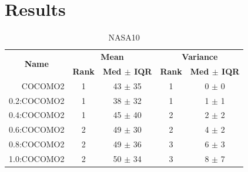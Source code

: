 \documentclass[final,twocolumn,5p]{elsarticle}
\theoremstyle{break}
\begin{document}
 \section{Results}
 
 
 
\begin{table}[!htpb]
\centering
\caption{NASA10}
\scriptsize
\label{tab:nasa10}
\begin{tabular}{|r|c|c|c|c|}
\hline
\multicolumn{1}{|c|}{\multirow{2}{*}{\textbf{Name}}} & \multicolumn{2}{c|}{\textbf{Mean}}     & \multicolumn{2}{c|}{\textbf{Variance}} \\ \cline{2-5} 
\multicolumn{1}{|c|}{}                               & \textbf{Rank} & \textbf{Med $\pm$ IQR} & \textbf{Rank} & \textbf{Med $\pm$ IQR} \\ \hline
COCOMO2                                              & 1             & 43 $\pm$ 35            & 1             & 0 $\pm$ 0              \\
0.2:COCOMO2                                          & 1             & 38 $\pm$ 32            & 1             & 1 $\pm$ 1              \\ \cline{4-5}
0.4:COCOMO2                                          & 1             & 45 $\pm$ 40            & 2             & 2 $\pm$ 2              \\ \cline{2-3}
0.6:COCOMO2                                          & 2             & 49 $\pm$ 30            & 2             & 4 $\pm$ 2              \\ \cline{4-5}
0.8:COCOMO2                                          & 2             & 49 $\pm$ 36            & 3             & 6 $\pm$ 3              \\
1.0:COCOMO2                                          & 2             & 50 $\pm$ 34            & 3             & 8 $\pm$ 7    \\ \hline         
\end{tabular}
\end{table}
\end{document}
